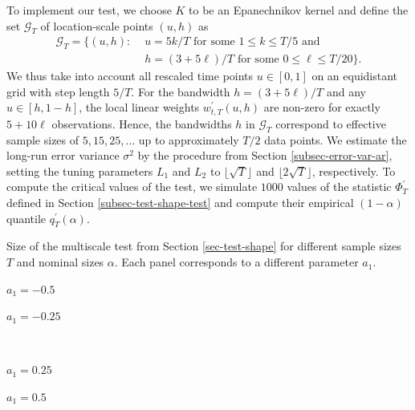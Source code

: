 \documentclass[a4paper,12pt]{article}
\begin{document}
To implement our test, we choose $K$ to be an Epanechnikov kernel and define the set $\mathcal{G}_T$ of location-scale points $(u,h)$ as
\begin{align}
\mathcal{G}_T = \big\{ (u, h): & \, \, u = 5k/T \text{ for some } 1 \le k \le T/5 \text{ and } \nonumber \\ & \, \, h = (3+5\ell)/T \text{ for some } 0 \le \ell \le T/20 \big\}. \label{grid-sim-app}
\end{align}
We thus take into account all rescaled time points $u \in [0,1]$ on an equidistant grid with step length $5/T$. For the bandwidth $h = (3 + 5\ell)/T$ and any $u \in [h,1-h]$, the local linear weights $w_{t,T}^\prime(u,h)$ are non-zero for exactly $5 + 10 \ell$ observations. Hence, the bandwidths $h$ in $\mathcal{G}_T$ correspond to effective sample sizes of $5, 15, 25, \ldots$ up to approximately $T/2$ data points. We estimate the long-run error variance $\sigma^2$ by the procedure from Section \ref{subsec-error-var-ar}, setting the tuning parameters $L_1$ and $L_2$ to $\lfloor \sqrt{T} \rfloor$ and $\lfloor 2\sqrt{T} \rfloor$, respectively. To compute the critical values of the test, we simulate $1000$ values of the statistic $\Phi^\prime_T$ defined in Section \ref{subsec-test-shape-test} and compute their empirical $(1-\alpha)$ quantile $q_T^\prime(\alpha)$. 


\begin{table}[t]
\footnotesize{
\begin{center}
\caption{Size of the multiscale test from Section \ref{sec-test-shape} for different sample sizes $T$ and nominal sizes $\alpha$. Each panel corresponds to a different parameter $a_1$.}\label{tab:size_shape}
\renewcommand{\arraystretch}{1.2}
\begin{subtable}[b]{0.48\textwidth}
\centering
\caption{$a_1 = -0.5$}\label{tab:size_shape_a_1_-050}
\renewcommand{\arraystretch}{1.2}

\end{subtable}
\begin{subtable}[b]{0.48\textwidth}
\centering
\caption{$a_1 = -0.25$}\label{tab:size_shape_a_1_-025}
\renewcommand{\arraystretch}{1.2}

\end{subtable}\\
\vspace{0.4cm}
\begin{subtable}[b]{0.48\textwidth}
\centering
\caption{$a_1 = 0.25$}\label{tab:size_shape_a_1_025}
\renewcommand{\arraystretch}{1.2}

\end{subtable}
\begin{subtable}[b]{0.48\textwidth}
\centering
\caption{$a_1 = 0.5$}\label{tab:size_shape_a_1_050}
\renewcommand{\arraystretch}{1.2}

\end{subtable}
\end{center}}
\vspace{-0.4cm}
\end{table}
\end{document}
